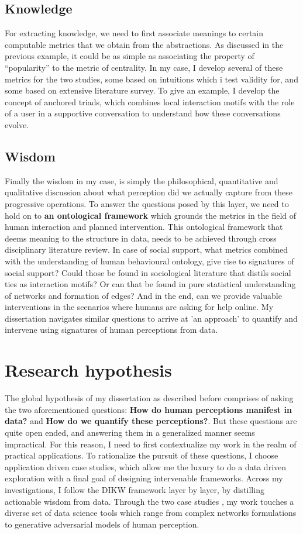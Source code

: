 \subsection{Knowledge}
For extracting knowledge, we need to first associate meanings to certain computable metrics that we obtain from the abstractions. As discussed in the previous example, it could be as simple as associating the property of ``popularity'' to the metric of centrality. In my case, I develop several of these metrics for the two studies, some based on intuitions which i test validity for, and some based on extensive literature survey. To give an example, I develop the concept of anchored triads, which combines local interaction motifs with the role of a user in a supportive conversation to understand how these conversations evolve. 

\subsection{Wisdom}
Finally the wisdom in my case, is simply the philosophical, quantitative and qualitative discussion about what perception did we actually capture from these progressive operations. To answer the questions posed by this layer, we need to hold on to \textbf{an ontological framework} which grounds the metrics in the field of human interaction and planned intervention. This ontological framework that deems meaning to the structure in data, needs to be achieved through cross disciplinary literature review. In case of social support, what metrics combined with the understanding of human behavioural ontology, give rise to signatures of social support? Could those be found in sociological literature that distils social ties as interaction motifs? Or can that be found in pure statistical understanding of networks and formation of edges?  And in the end, can we provide valuable interventions in the scenarios where humans are asking for help online. My dissertation navigates similar questions to arrive at 'an approach' to quantify and intervene using signatures of human perceptions from data.

\section{Research hypothesis}
The global hypothesis of my dissertation as described before comprises of asking the two aforementioned questions: \textbf{How do human perceptions manifest in data?} and \textbf{How do we quantify these perceptions?}. But these questions are quite open ended, and answering them in a generalized manner seems impractical. For this reason, I need to first contextualize my work in the realm  of practical applications. 
To rationalize the pursuit of these questions, I choose application driven case studies, which allow me the luxury to do a data driven exploration with a final goal of designing intervenable frameworks.
Across my investigations, I follow the DIKW framework layer by layer, by distilling actionable wisdom from data. Through the two case studies , my work touches a diverse set of data science tools  which range from complex networks formulations to generative adversarial models of human perception.


